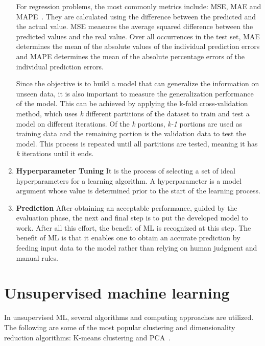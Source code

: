 \begin{enumerate}
\begin{table}[ht]
\begin{tabular}{p{2.5cm}cc}
    	\bottomrule
    \end{tabular}
    \end{table}
    
    For regression problems, the most commonly metrics include: \gls{MSE}, \gls{MAE} and \gls{MAPE}~\cite{Botchkarev2018PerformanceTypology}. They are calculated using the difference between the predicted and the actual value. \gls{MSE} measures the average squared difference between the predicted values and the real value. Over all occurrences in the test set, \gls{MAE} determines the mean of the absolute values of the individual prediction errors and \gls{MAPE} determines the mean of the absolute percentage errors of the individual prediction errors. 
    
    Since the objective is to build a model that can generalize the information on unseen data, it is also important to measure the generalization performance of the model. This can be achieved by applying the k-fold cross-validation method, which uses \textit{k} different partitions of the dataset to train and test a model on different iterations. Of the \textit{k} portions, \textit{k-1} portions are used as training data and the remaining portion is the validation data to test the model. This process is repeated until all partitions are tested, meaning it has \textit{k} iterations until it ends.
    
    \item \textbf{Hyperparameter Tuning} It is the process of selecting a set of ideal hyperparameters for a learning algorithm. A hyperparameter is a model argument whose value is determined prior to the start of the learning process. 
    
    \item \textbf{Prediction} After obtaining an acceptable performance, guided by the evaluation phase, the next and final step is to put the developed model to work. After all this effort, the benefit of \gls{ML} is recognized at this step. The benefit of \gls{ML} is that it enables one to obtain an accurate prediction by feeding input data to the model rather than relying on human judgment and manual rules.

\end{enumerate}

\section{Unsupervised machine learning}

In unsupervised \gls{ML}, several algorithms and computing approaches are utilized. The following are some of the most popular clustering and dimensionality reduction algorithms: K-means clustering and \gls{PCA}~\cite{Chugh2018TypesKnow}.

